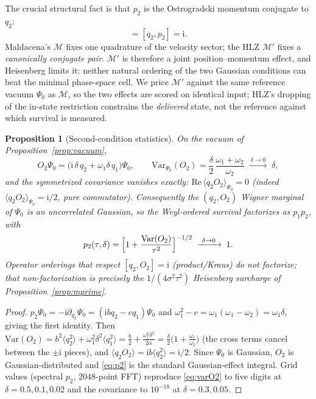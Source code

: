 \documentclass[11pt]{article}
\newtheorem{proposition}[theorem]{Proposition}
\theoremstyle{definition}
\theoremstyle{remark}
\newcommand{\ii}{\mathrm{i}}
\begin{document}
The crucial structural fact is that $p_{2}$ is the Ostrogradski
momentum conjugate to $q_{2}$:
\begin{equation}
[q_{2},O_{2}]=[q_{2},p_{2}]=\ii .
\label{eq:conjugate}
\end{equation}
Maldacena's $\mathcal{M}$ fixes one quadrature of the velocity sector; the HLZ
$\mathcal{M}'$ fixes a \emph{canonically conjugate pair}. $\mathcal{M}'$ is therefore a
joint position--momentum effect, and Heisenberg limits it: neither natural
ordering of the two Gaussian conditions can beat the minimal
phase-space cell. We price $\mathcal{M}'$ against the same reference vacuum
$\Psi_{0}$ as $\mathcal{M}$, so the two effects are scored on identical input;
HLZ's dropping of the in-state restriction constrains the
\emph{delivered} state, not the reference against which survival is
measured.

\begin{proposition}[Second-condition statistics]
\label{prop:O2}
On the vacuum of Proposition~\ref{prop:vacuum},
\begin{equation}
O_{2}\Psi_{0}=\bigl(\ii\,\delta\,q_{2}
+\omega_{1}\delta\,q_{1}\bigr)\Psi_{0},
\qquad
\mathrm{Var}_{\Psi_{0}}(O_{2})
=\frac{\delta}{2}\,\frac{\omega_{1}+\omega_{2}}{\omega_{2}}
\;\xrightarrow{\ \delta\to0\ }\;\delta,
\label{eq:varO2}
\end{equation}
and the symmetrized covariance vanishes exactly:
$\mathrm{Re}\,\langle q_{2}O_{2}\rangle_{\Psi_{0}}=0$
(indeed $\langle q_{2}O_{2}\rangle_{\Psi_{0}}=\ii/2$, pure
commutator). Consequently the $(q_{2},O_{2})$ Wigner marginal of $\Psi_{0}$ is an
uncorrelated Gaussian, so the \emph{Weyl}-ordered survival factorizes
as $p_{1}p_{2}$, with
\begin{equation}
p_{2}(\tau,\delta)
=\Bigl[1+\frac{\mathrm{Var}(O_{2})}{\tau^{2}}\Bigr]^{-1/2}
\;\xrightarrow{\ \delta\to0\ }\;1 .
\label{eq:p2}
\end{equation}
Operator orderings that respect $[q_{2},O_{2}]=\ii$ (product/Kraus)
do \emph{not} factorize; that non-factorization is precisely the
$1/(4\sigma^{2}\tau^{2})$ Heisenberg surcharge of
Proposition~\ref{prop:mprime}.
\end{proposition}

\begin{proof}
$p_{2}\Psi_{0}=-\ii\partial_{q_{2}}\Psi_{0}
=(\ii b q_{2}-cq_{1})\Psi_{0}$ and
$\omega_{1}^{2}-c=\omega_{1}(\omega_{1}-\omega_{2})
=\omega_{1}\delta$, giving the first identity. Then
$\mathrm{Var}(O_{2})=b^{2}\langle q_{2}^{2}\rangle
+\omega_{1}^{2}\delta^{2}\langle q_{1}^{2}\rangle
=\tfrac{b}{2}+\tfrac{\omega_{1}^{2}\delta^{2}}{2\alpha}
=\tfrac{\delta}{2}\bigl(1+\tfrac{\omega_{1}}{\omega_{2}}\bigr)$
(the cross terms cancel between the $\pm\ii$ pieces), and
$\langle q_{2}O_{2}\rangle
=\ii b\langle q_{2}^{2}\rangle=\ii/2$. Since $\Psi_{0}$ is Gaussian,
$O_{2}$ is Gaussian-distributed and \eqref{eq:p2} is the standard
Gaussian-effect integral. Grid values (spectral $p_{2}$,
$2048$-point FFT) reproduce \eqref{eq:varO2} to five digits at
$\delta=0.5,0.1,0.02$ and the covariance to $10^{-18}$ at
$\delta=0.3,0.05$.
\end{proof}
\end{document}
